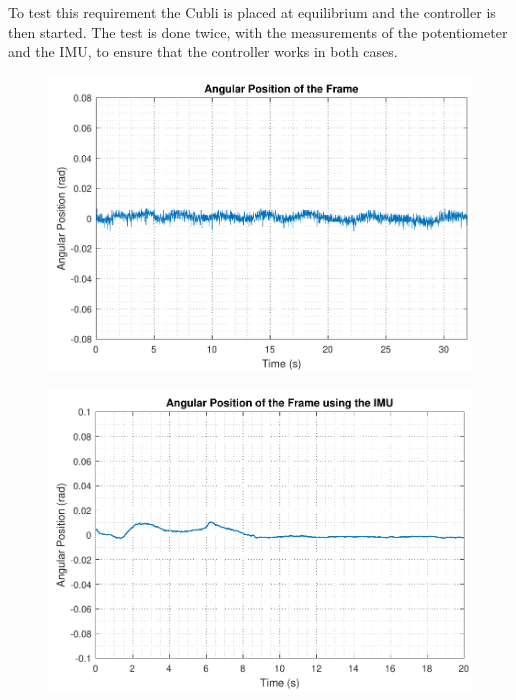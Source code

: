 To test this requirement the Cubli is placed at equilibrium and the controller is then started. The test is done twice, with the measurements of the potentiometer and the IMU, to ensure that the controller works in both cases.
%
\begin{minipage}{\linewidth}
	\begin{minipage}{0.45\linewidth}
		\begin{figure}[H]
			\includegraphics[scale=.45]{figures/testReq1}
			\centering
			\captionsetup{justification=centering}
			\label{testReq1}
		\end{figure}
	\end{minipage}
	\hspace{0.03\linewidth}
	\begin{minipage}{0.45\linewidth}
		\begin{figure}[H]\vspace{0mm}
			\includegraphics[scale=.45]{figures/testReq1_IMU}
			\centering
			\captionsetup{justification=centering}
			\label{testReq1_IMU}
		\end{figure}
	\end{minipage}
\end{minipage}
%

